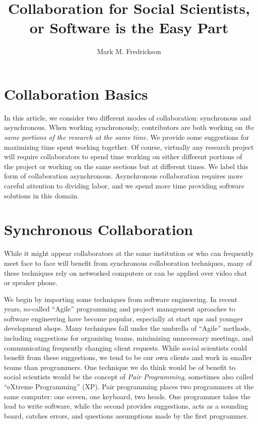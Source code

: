 \documentclass[]{article}
\author{Mark M. Fredrickson} %
\title{Collaboration for Social Scientists, or Software is the Easy Part}
\begin{document}
\maketitle

\section{Collaboration Basics}


In this article, we consider two different modes of collaboration: synchronous
and asynchronous. When working synchronously, contributors are both working on
\emph{the same portions of the research at the same time}. We provide some
suggestions for maximizing time spent working together. Of course, virtually
any research project will require collaborators to spend time working on
either different portions of the project or working on the same sections but
at different times. We label this form of collaboration asynchronous.
Asynchronous collaboration requires more careful attention to dividing labor,
and we spend more time providing software solutions in this domain.

\section{Synchronous Collaboration}

While it might appear collaborators at the same institution or who can
frequently meet face to face will benefit from synchronous collaboration
techniques, many of these techniques rely on networked computers or can be
applied over video chat or speaker phone.

We begin by importing some techniques from software engineering. In recent
years, so-called ``Agile'' programming and project management aproaches to
software engineering have become popular, especially at start ups and younger
development shops. Many techniques fall under the umbrella of ``Agile''
methods, including suggestions for organizing teams, minimizing unnecessary
meetings, and communicating frequently changing client requests. While social
scientists could benefit from these suggestions, we tend to be our own clients
and work in smaller teams than programmers. One technique we do think would be
of benefit to social scientists would be the concept of \emph{Pair
Programming,} sometimes also called ``eXtreme Programming'' (XP). Pair
programming places two programmers at the same computer: one screen, one
keyboard, two heads. One programmer takes the lead to write software, while
the second provides suggestions, acts as a sounding board, catches errors, and
questions assumptions made by the first programmer. 
\end{document}
